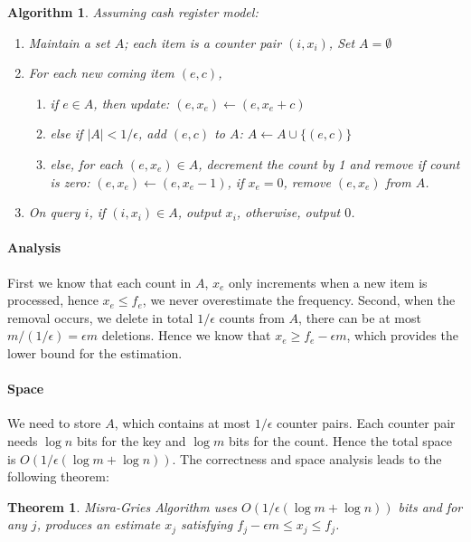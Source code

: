 \documentclass[11pt]{article}
\theoremstyle{plain}
\newtheorem{theorem}{Theorem}[section]
\newtheorem{algorithm}{Algorithm}[section]
\begin{document}
\begin{algorithm}
\label{al:misra-gries}
Assuming cash register model:
\begin{enumerate}
	\item Maintain a set $A$; each item is a counter pair $(i, x_i)$, Set 
	$A=\emptyset$
	\item For each new coming item $(e,c)$, 
	\begin{enumerate}
		\item if $e \in A$, then update: $(e, x_e)\leftarrow (e, x_e+c)$
		\item else if $|A|<1/\epsilon$, add $(e,c)$ to $A$:  $A \leftarrow 
		A\cup\{(e,c)\}$
		\item else, for each $(e,x_e)\in A$, decrement the count by 1 and remove if 
		count is zero: $(e,x_e)\leftarrow (e, x_e-1)$, if $x_e=0$, remove $(e,x_e)$ 
		from $A$.
	\end{enumerate}
\item On query $i$, if $(i,x_i)\in A$, output $x_i$, otherwise, output $0$.
\end{enumerate}
\end{algorithm}

\paragraph{Analysis} First we know that each count in $A$, $x_e$ only 
increments when a new item is processed, hence $x_e\leq f_e$, we never 
overestimate the frequency. Second, when the removal occurs, we delete in total 
$1/\epsilon$ counts from $A$, there can be at most $m/(1/\epsilon)=\epsilon m$ 
deletions. Hence we know that $x_e\geq f_e-\epsilon m$, which provides the 
lower bound for the estimation. 

\paragraph{Space} We need to store $A$, which contains at most $1/\epsilon$ 
counter pairs. Each counter pair needs $\log n$ bits for the key and $\log m$ 
bits 
for the count. Hence the total space is $O(1/\epsilon(\log m +\log n))$. The 
correctness and space analysis leads to the following theorem:

\begin{theorem}
Misra-Gries Algorithm uses $O(1/\epsilon(\log m +\log n))$ bits and for any $j$, 
produces an estimate $x_j$ satisfying $f_j-\epsilon m \leq x_j \leq f_j$. 
\end{theorem}
\end{document}
